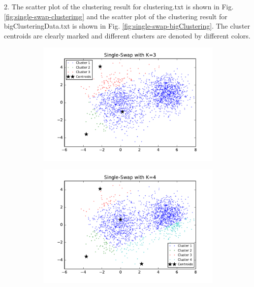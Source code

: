 \begin{description}
\begin{description}
\item{2.} The scatter plot of the clustering result for clustering.txt is shown in Fig. \ref{fig:single-swap-clusterimg} and the scatter plot of the clustering result for bigClusteringData.txt is shown in Fig. \ref{fig:single-swap-bigClustering}. The cluster centroids are clearly marked and different clusters are denoted by different colors. 

\begin{figure}[!h]
        \centering
        \begin{subfigure}[b]{0.475\textwidth}
            \centering
            \includegraphics[width=\textwidth]{./figures/clustering_singleSwap_3.pdf}
        \end{subfigure}
        \hfill
        \begin{subfigure}[b]{0.475\textwidth}  
            \centering 
            \includegraphics[width=\textwidth]{./figures/clustering_singleSwap_4.pdf}

\end{subfigure}
\end{figure}
\end{description}
\end{description}
